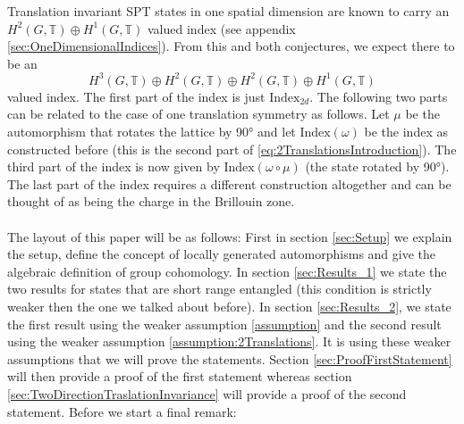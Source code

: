 \documentclass[12pt,a4paper,twoside]{article}
\newcommand{\TT}{\mathbb T}
\theoremstyle{definition}
\numberwithin{equation}{section}
\begin{document}
Translation invariant SPT states in one spatial dimension are known to carry an $H^2(G,\TT)\oplus H^1(G,\TT)$ valued index (see appendix \ref{sec:OneDimensionalIndices}). From this and both conjectures, we expect there to be an
\begin{equation}\label{eq:2TranslationsIntroduction}
	H^3(G,\TT)\oplus H^2(G,\TT)\oplus H^2(G,\TT)\oplus H^1(G,\TT)
\end{equation}
valued index. The first part of the index is just $\textrm{Index}_{2d}$. The following two parts can be related to the case of one translation symmetry as follows. Let $\mu$ be the automorphism that rotates the lattice by 90° and let $\textrm{Index}(\omega)$ be the index as constructed before (this is the second part of \ref{eq:2TranslationsIntroduction}). The third part of the index is now given by $\textrm{Index}(\omega\circ\mu)$ (the state rotated by 90°). The last part of the index requires a different construction altogether and can be thought of as being the charge in the Brillouin zone.\\\\
The layout of this paper will be as follows: First in section \ref{sec:Setup} we explain the setup, define the concept of locally generated automorphisms and give the algebraic definition of group cohomology. In section \ref{sec:Results_1} we state the two results for states that are short range entangled (this condition is strictly weaker then the one we talked about before). In section \ref{sec:Results_2}, we state the first result using the weaker assumption \ref{assumption} and the second result using the weaker assumption \ref{assumption:2Translations}. It is using these weaker assumptions that we will prove the statements. Section \ref{sec:ProofFirstStatement} will then provide a proof of the first statement whereas section \ref{sec:TwoDirectionTraslationInvariance} will provide a proof of the second statement.
\newpage
Before we start a final remark:
\end{document}
